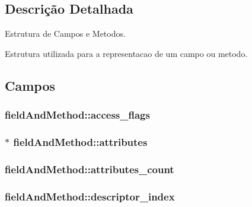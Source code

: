 \subsection{Descrição Detalhada}
Estrutura de Campos e Metodos. 

Estrutura utilizada para a representacao de um campo ou metodo. 

\subsection{Campos}
\hypertarget{structfield_and_method_a04b1604b7553b064887cc578d441d7aa}{}
\subsubsection[{access\+\_\+flags}]{ field\+And\+Method\+::access\+\_\+flags}\label{structfield_and_method_a04b1604b7553b064887cc578d441d7aa}
\hypertarget{structfield_and_method_ad7062d512c3653c46dfa1fb6acf07396}{}
\subsubsection[{attributes}]{$\ast$ field\+And\+Method\+::attributes}\label{structfield_and_method_ad7062d512c3653c46dfa1fb6acf07396}
\hypertarget{structfield_and_method_a0b45411cd7a3167fdcfad1af18a799e5}{}
\subsubsection[{attributes\+\_\+count}]{ field\+And\+Method\+::attributes\+\_\+count}\label{structfield_and_method_a0b45411cd7a3167fdcfad1af18a799e5}
\hypertarget{structfield_and_method_a61c33b04e96966edbfd142eea9992834}{}
\subsubsection[{descriptor\+\_\+index}]{ field\+And\+Method\+::descriptor\+\_\+index}\label{structfield_and_method_a61c33b04e96966edbfd142eea9992834}
\hypertarget{structfield_and_method_ac636d7076db5a2ce9891613be8ad9b00}{}
